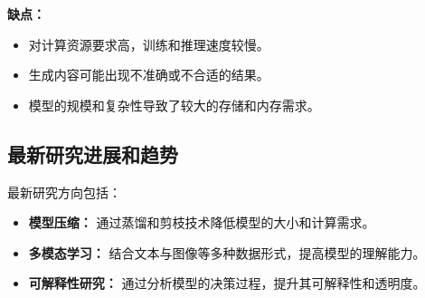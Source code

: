 \textbf{缺点：}
\begin{itemize}
    \item 对计算资源要求高，训练和推理速度较慢。
    \item 生成内容可能出现不准确或不合适的结果。
    \item 模型的规模和复杂性导致了较大的存储和内存需求。
\end{itemize}

\subsection*{最新研究进展和趋势}
最新研究方向包括：
\begin{itemize}
    \item \textbf{模型压缩：} 通过蒸馏和剪枝技术降低模型的大小和计算需求。
    \item \textbf{多模态学习：} 结合文本与图像等多种数据形式，提高模型的理解能力。
    \item \textbf{可解释性研究：} 通过分析模型的决策过程，提升其可解释性和透明度。
\end{itemize}
